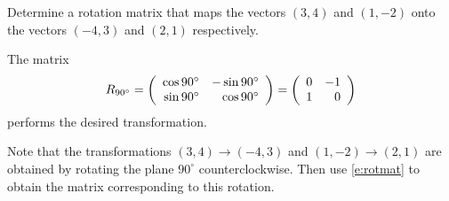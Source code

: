 \documentclass{ximera}
\begin{document}
\begin{exercise} \label{c7.8.2}
Determine a rotation matrix that maps the vectors $(3,4)$ and
$(1,-2)$ onto the vectors $(-4,3)$ and $(2,1)$ respectively.

\begin{solution}

\ans The matrix
\[ R_{90^\circ} = \left(\begin{array}{rr} \cos{90^\circ} & -\sin{90^\circ}\\ \sin{90^\circ} &\cos{90^\circ}\end{array}\right) = \left(\begin{array}{rr} 0 & -1\\ 1 &0\end{array}\right) \]
performs the desired transformation.

\soln Note that the transformations $(3,4) \rightarrow (-4,3)$ and
$(1,-2) \rightarrow (2,1)$ are obtained by rotating the plane
$90^\circ$ counterclockwise.  Then use \eqref{e:rotmat} to obtain the
matrix corresponding to this rotation.

\end{solution}
\end{exercise}
\end{document}

